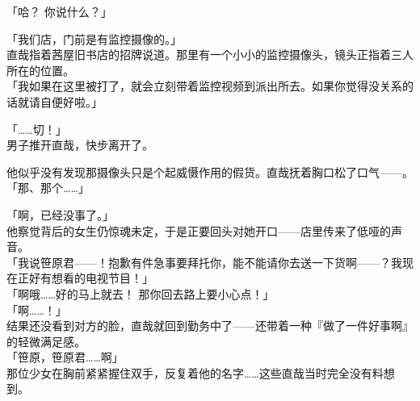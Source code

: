 「哈？ 你说什么？」

「我们店，门前是有监控摄像的。」\\

直哉指着茜屋旧书店的招牌说道。那里有一个小小的监控摄像头，镜头正指着三人所在的位置。\\

「我如果在这里被打了，就会立刻带着监控视频到派出所去。如果你觉得没关系的话就请自便好啦。」

「……切！」\\

男子推开直哉，快步离开了。

他似乎没有发现那摄像头只是个起威慑作用的假货。直哉抚着胸口松了口气——。\\

「那、那个……」

「啊，已经没事了。」\\

他察觉背后的女生仍惊魂未定，于是正要回头对她开口——店里传来了低哑的声音。\\

「我说笹原君——！抱歉有件急事要拜托你，能不能请你去送一下货啊——？我现在正好有想看的电视节目！」\\

「啊哦……好的马上就去！ 那你回去路上要小心点！」\\

「啊……！」\\

结果还没看到对方的脸，直哉就回到勤务中了——还带着一种『做了一件好事啊』的轻微满足感。\\

「笹原，笹原君……啊」\\

那位少女在胸前紧紧握住双手，反复着他的名字……这些直哉当时完全没有料想到。\\
